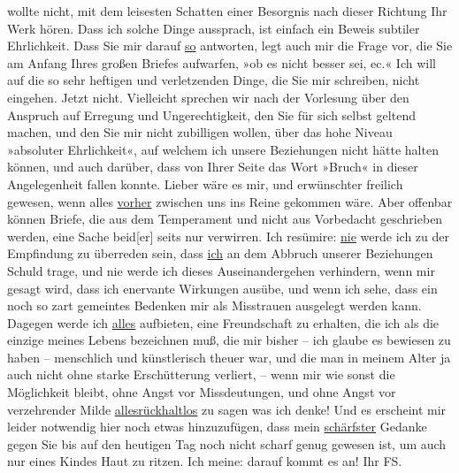 \begin{ledgroupsized}[t]{13cm}
               wollte nicht, mit dem leisesten Schatten einer Besorgnis nach dieser Richtung Ihr
               Werk hören. Dass ich solche Dinge aussprach, ist einfach ein Beweis subtiler
               Ehrlichkeit. Dass Sie mir darauf \uline{so} antworten, legt
               auch mir die Frage vor, die Sie am Anfang Ihres großen Briefes aufwarfen, »ob es
               nicht besser sei, ec.« \pend
           \pstart
           Ich will auf die so sehr heftigen und verletzenden Dinge, die Sie mir schreiben,
               nicht eingehen. Jetzt nicht. Vielleicht sprechen wir nach der Vorlesung über den
               Anspruch auf Erregung und Ungerechtigkeit, den Sie für sich selbst geltend machen,
               und den Sie mir nicht zubilligen wollen, über das hohe Niveau »absoluter
               Ehrlichkeit«, auf welchem ich unsere Beziehungen nicht hätte halten können, und auch
               darüber, dass von Ihrer Seite das Wort »Bruch« in dieser Angelegenheit fallen konnte.
               Lieber wäre es mir, und erwünschter freilich gewesen, wenn alles \uline{vorher} zwischen uns ins Reine gekommen wäre. Aber offenbar können
               Briefe, die aus dem Temperament und nicht aus Vorbedacht geschrieben werden, eine
               Sache beid{[}er{]} seits nur verwirren. Ich resümire: \uline{nie} werde ich {\pb}zu der Empfindung zu überreden
               sein, dass \uline{ich} an dem Abbruch unserer Beziehungen
               Schuld trage, und nie werde ich dieses Auseinandergehen verhindern, wenn mir gesagt
               wird, dass ich enervante Wirkungen ausübe, und wenn ich sehe, dass ein noch so zart
               gemeintes Bedenken mir als Misstrauen ausgelegt werden kann. \pend
           \pstart
           Dagegen werde ich \uline{alles} aufbieten, eine Freundschaft
               zu erhalten, die ich als die einzige meines Lebens bezeichnen muß, die mir bisher –
               ich glaube es bewiesen zu haben – menschlich und künstlerisch theuer war, und die man
               in meinem Alter ja auch nicht ohne starke Erschütterung verliert, – wenn mir wie
               sonst die Möglichkeit bleibt, ohne Angst vor Missdeutungen, und ohne Angst vor
               verzehrender Milde \uline{alles}\uline{rückhaltlos} zu sagen was ich denke! Und es erscheint
               mir leider notwendig hier noch etwas hinzuzufügen, dass mein \uline{schärfster} Gedanke \introOben{}gegen Sie\introOben{} bis auf den
               heutigen Tag noch nicht scharf genug gewesen ist, um auch nur eines Kindes Haut zu
               ritzen. Ich meine: darauf kommt es an! \pend
           \pstart Ihr \spacefill\mbox{FS.}\pend{}
         
         \endnumbering{}\end{ledgroupsized}\begin{anhang}\end{anhang}\newcommand{\dateiname}{L03355}\newcommand{\titel}{Felix Salten an Arthur Schnitzler, [11. 11?. 1903]}\newcommand{\editorInnen}{Martin Anton Müller und Laura Untner}
      